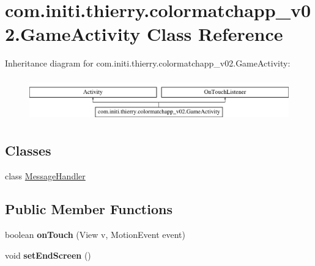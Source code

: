 \hypertarget{classcom_1_1initi_1_1thierry_1_1colormatchapp__v02_1_1_game_activity}{}\section{com.\+initi.\+thierry.\+colormatchapp\+\_\+v02.\+Game\+Activity Class Reference}
\label{classcom_1_1initi_1_1thierry_1_1colormatchapp__v02_1_1_game_activity}
Inheritance diagram for com.\+initi.\+thierry.\+colormatchapp\+\_\+v02.\+Game\+Activity\+:\begin{figure}[H]
\begin{center}
\leavevmode
\includegraphics[height=1.866667cm]{classcom_1_1initi_1_1thierry_1_1colormatchapp__v02_1_1_game_activity}
\end{center}
\end{figure}
\subsection*{Classes}
\begin{DoxyCompactItemize}
\item 
class \hyperlink{classcom_1_1initi_1_1thierry_1_1colormatchapp__v02_1_1_game_activity_1_1_message_handler}{Message\+Handler}
\end{DoxyCompactItemize}
\subsection*{Public Member Functions}
\begin{DoxyCompactItemize}
\item 
boolean {\bfseries on\+Touch} (View v, Motion\+Event event)\hypertarget{classcom_1_1initi_1_1thierry_1_1colormatchapp__v02_1_1_game_activity_a35978f8a04e8d110025578a6c557fb92}{}\label{classcom_1_1initi_1_1thierry_1_1colormatchapp__v02_1_1_game_activity_a35978f8a04e8d110025578a6c557fb92}

\item 
void {\bfseries set\+End\+Screen} ()\hypertarget{classcom_1_1initi_1_1thierry_1_1colormatchapp__v02_1_1_game_activity_a940896f4e20418492d3458ac828d1f6b}{}\label{classcom_1_1initi_1_1thierry_1_1colormatchapp__v02_1_1_game_activity_a940896f4e20418492d3458ac828d1f6b}

\end{DoxyCompactItemize}
